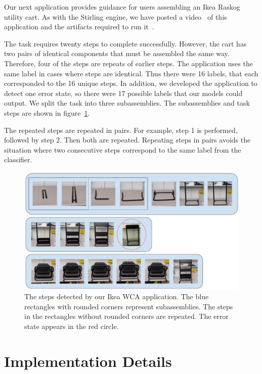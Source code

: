 Our next application provides guidance for users assembling an Ikea Raskog
utility cart.
As with the Stirling engine, we have posted a video~\cite{ikea_youtube} of this
application and the artifacts required to run it~\cite{ikea_github}.

The task requires twenty steps to complete successfully.
However, the cart has two pairs of identical components that must be
assembled the same way.
Therefore, four of the steps are repeats of earlier steps.
The application uses the same label in cases where steps are identical.
Thus there were 16 labels, that each corresponded to the 16 unique steps.
In addition, we developed the application to detect one error state, so there
were 17 possible labels that our models could output.
We split the task into three subassemblies.
The subassemblies and task steps are shown in figure~\ref{fig:ikea_cart}.

The repeated steps are repeated in pairs. For example, step 1 is performed,
followed by step 2.
Then both are repeated.
Repeating steps in pairs avoids the situation where two consecutive steps
correspond to the same label from the classifier.

\begin{figure}
  \includegraphics[width=\columnwidth]{figures/ikea_subassemblies.pdf}
  \caption{
    The steps detected by our Ikea WCA application.
    The blue rectangles with rounded corners represent subassemblies.
    The steps in the rectangles without rounded corners are repeated.
    The error state appears in the red circle.
  }\label{fig:ikea_cart}
\end{figure}

\section{Implementation Details}

